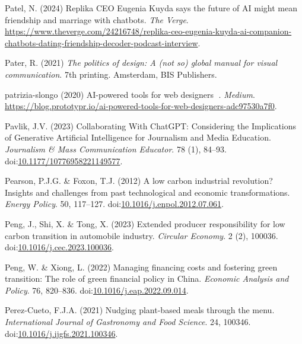 \documentclass[
  letterpaper,
  DIV=11,
  numbers=noendperiod]{scrartcl}
\newlength{\cslhangindent}
\newenvironment{CSLReferences}[2] %
 {\begin{list}{}{%
  \setlength{\itemindent}{0pt}
  \setlength{\leftmargin}{0pt}
  \setlength{\parsep}{0pt}
  \ifodd #1
   \setlength{\leftmargin}{\cslhangindent}
   \setlength{\itemindent}{-1\cslhangindent}
  \fi
  \setlength{\itemsep}{#2\baselineskip}}}
 {\end{list}}
\begin{document}
\begin{CSLReferences}{0}{1}
Patel, N. (2024) Replika {CEO Eugenia Kuyda} says the future of {AI}
might mean friendship and marriage with chatbots. \emph{The Verge}.
\url{https://www.theverge.com/24216748/replika-ceo-eugenia-kuyda-ai-companion-chatbots-dating-friendship-decoder-podcast-interview}.

Pater, R. (2021) \emph{The politics of design: A (not so) global manual
for visual communication}. 7th printing. Amsterdam, BIS Publishers.

patrizia-slongo (2020) {AI-powered} tools for web designers 🤖.
\emph{Medium}.
\url{https://blog.prototypr.io/ai-powered-tools-for-web-designers-adc97530a7f0}.

Pavlik, J.V. (2023) Collaborating {With ChatGPT}: {Considering} the
{Implications} of {Generative Artificial Intelligence} for {Journalism}
and {Media Education}. \emph{Journalism \& Mass Communication Educator}.
78 (1), 84--93.
doi:\href{https://doi.org/10.1177/10776958221149577}{10.1177/10776958221149577}.

Pearson, P.J.G. \& Foxon, T.J. (2012) A low carbon industrial
revolution? {Insights} and challenges from past technological and
economic transformations. \emph{Energy Policy}. 50, 117--127.
doi:\href{https://doi.org/10.1016/j.enpol.2012.07.061}{10.1016/j.enpol.2012.07.061}.

Peng, J., Shi, X. \& Tong, X. (2023) Extended producer responsibility
for low carbon transition in automobile industry. \emph{Circular
Economy}. 2 (2), 100036.
doi:\href{https://doi.org/10.1016/j.cec.2023.100036}{10.1016/j.cec.2023.100036}.

Peng, W. \& Xiong, L. (2022) Managing financing costs and fostering
green transition: {The} role of green financial policy in {China}.
\emph{Economic Analysis and Policy}. 76, 820--836.
doi:\href{https://doi.org/10.1016/j.eap.2022.09.014}{10.1016/j.eap.2022.09.014}.

Perez-Cueto, F.J.A. (2021) Nudging plant-based meals through the menu.
\emph{International Journal of Gastronomy and Food Science}. 24, 100346.
doi:\href{https://doi.org/10.1016/j.ijgfs.2021.100346}{10.1016/j.ijgfs.2021.100346}.


\end{CSLReferences}
\end{document}

